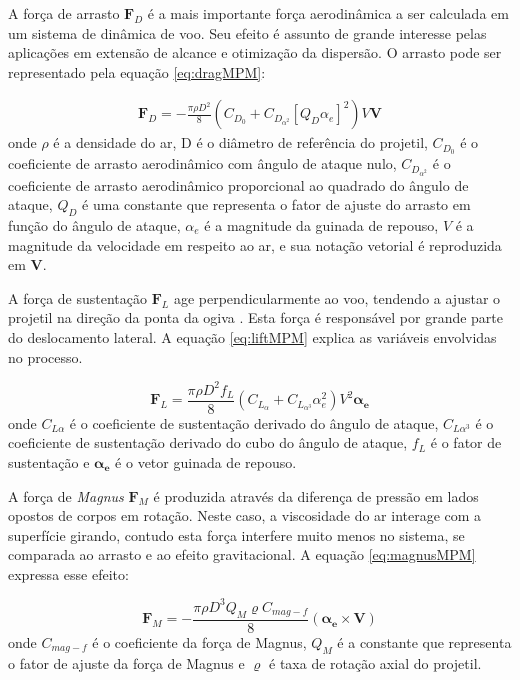 A força de arrasto \(\boldsymbol{F}_{D}\) é a mais importante força aerodinâmica a ser calculada em um sistema de dinâmica de voo. Seu efeito é assunto de grande interesse pelas aplicações em extensão de alcance e otimização da dispersão. O arrasto pode ser representado pela equação \ref{eq:dragMPM}:

\begin{gather}
    \label{eq:dragMPM}
    \boldsymbol{F}_{D} = -\frac{\pi \rho D^{2}}{8} (C_{D_{0}} + C_{D_{\alpha^{2}}} [Q_{D}\alpha_{e}]^{2})V\boldsymbol{V}
\end{gather}
%
onde \(\rho\) é a densidade do ar, D é o diâmetro de referência do projetil, \(C_{D_{0}}\) é o coeficiente de arrasto aerodinâmico com ângulo de ataque nulo, \(C_{D_{\alpha^{2}}}\) é o coeficiente de arrasto aerodinâmico proporcional ao quadrado do ângulo de ataque, \(Q_{D}\) é uma constante que representa o fator de ajuste do arrasto em função do ângulo de ataque, \(\alpha_{e}\) é a magnitude da guinada de repouso, \(V\) é a magnitude da velocidade em respeito ao ar, e sua notação vetorial é reproduzida em \(\boldsymbol{V}\).

A força de sustentação \(\boldsymbol{F}_{L}\) age perpendicularmente ao voo, tendendo a ajustar o projetil na direção da ponta da ogiva \cite{McCoy2012}. Esta força é responsável por grande parte do deslocamento lateral. A equação \ref{eq:liftMPM} explica as variáveis envolvidas no processo.

\begin{equation}
    \label{eq:liftMPM}
    \boldsymbol{F}_{L} = \frac{\pi \rho D^{2} f_{L}}{8} (C_{L_{\alpha}}+C_{L_{\alpha^3}}\alpha_{e}^{2})V^{2} \boldsymbol{\alpha_{e}}
\end{equation}
%
onde \(C_{L\alpha}\) é o coeficiente de sustentação derivado do ângulo de ataque, \(C_{L\alpha^{3}}\) é o coeficiente de sustentação derivado do cubo do ângulo de ataque, \(f_{L}\) é o fator de sustentação e \(\boldsymbol{\alpha_{e}}\) é o vetor guinada de repouso.

A força de \textit{Magnus} \(\boldsymbol{F}_{M}\) é produzida através da diferença de pressão em lados opostos de corpos em rotação. Neste caso, a viscosidade do ar interage com a superfície girando, contudo esta força interfere muito menos no sistema, se comparada ao arrasto e ao efeito gravitacional. A equação \ref{eq:magnusMPM} expressa esse efeito: 

\begin{equation}
    \label{eq:magnusMPM}
    \boldsymbol{F}_{M} = -\frac{\pi \rho D^{3} Q_{M} \varrho C_{mag-f}}{8}(\boldsymbol{\alpha_{e}} \times \boldsymbol{V})
\end{equation}
%
onde \(C_{mag-f}\) é o coeficiente da força de Magnus, \(Q_{M}\) é a constante que representa o fator de ajuste da força de Magnus e \(\varrho\) é taxa de rotação axial do projetil.

